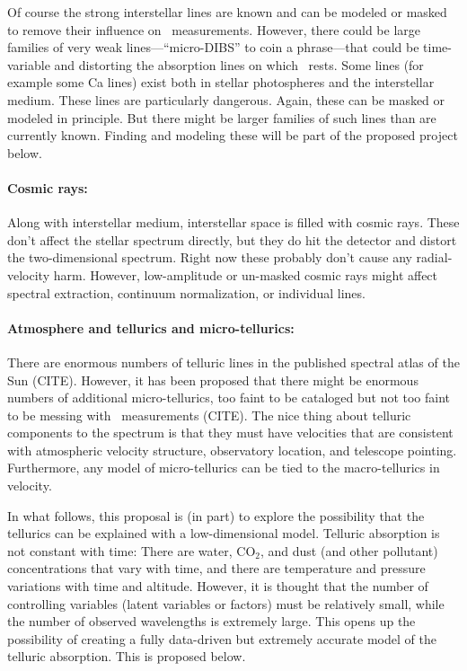 \documentclass[12pt, fullpage, letterpaper]{article}
\begin{document}
Of course the strong interstellar lines are known and can be modeled or masked
to remove their influence on \EPRV\ measurements.
However, there could be large families of very weak
lines---``micro-DIBS'' to coin a phrase---that could be time-variable
and distorting the absorption lines on which \EPRV\ rests.
Some lines (for example some Ca lines) exist both in stellar photospheres
and the interstellar medium. These lines are particularly dangerous.
Again, these can be masked or modeled in principle. But there might be
larger families of such lines than are currently known.
Finding and modeling these will be part of the proposed project below.

\paragraph{Cosmic rays:}
Along with interstellar medium, interstellar space is filled with cosmic
rays.
These don't affect the stellar spectrum directly, but they do hit the detector
and distort the two-dimensional spectrum.
Right now these probably don't cause any radial-velocity harm.
However, low-amplitude or un-masked cosmic rays might affect spectral extraction,
continuum normalization, or individual lines.

\paragraph{Atmosphere and tellurics and micro-tellurics:}
There are enormous numbers of telluric lines in the published spectral atlas
of the Sun (CITE). However, it has been proposed that there might be enormous
numbers of additional micro-tellurics, too faint to be cataloged but not too faint
to be messing with \EPRV\ measurements (CITE).
The nice thing about telluric components to the spectrum is that they must
have velocities that are consistent with atmospheric velocity structure,
observatory location,  and telescope pointing.
Furthermore, any model of micro-tellurics can be tied to the macro-tellurics
in velocity.

In what follows, this proposal is (in part) to explore the possibility that the tellurics can be
explained with a low-dimensional model.
Telluric absorption is not constant with time: There are water,
CO$_2$, and dust (and other pollutant) concentrations that vary with time, and
there are temperature and pressure variations with time and altitude.
However, it is thought that the number of controlling variables (latent variables or
factors) must be relatively small, while the number of observed wavelengths is
extremely large.
This opens up the possibility of creating a fully data-driven but extremely accurate
model of the telluric absorption. This is proposed below.
\end{document}
